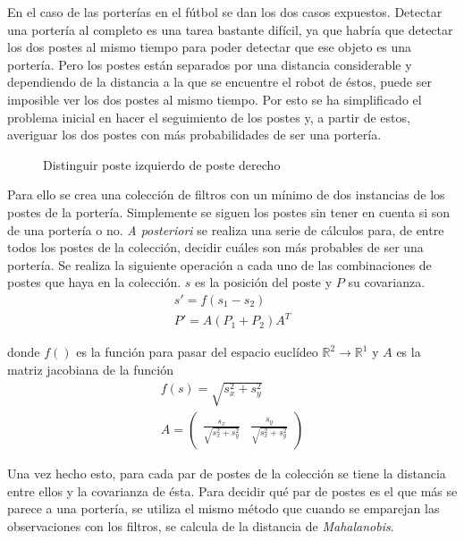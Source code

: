 En el caso de las porterías en el fútbol se dan los dos casos expuestos. Detectar una portería al completo es una tarea bastante difícil, ya que habría que detectar los dos postes al mismo tiempo para poder detectar que ese objeto es una portería. Pero los postes están separados por una distancia considerable y dependiendo de la distancia a la que se encuentre el robot de éstos, puede ser imposible ver los dos postes al mismo tiempo. Por esto se ha simplificado el problema inicial en hacer el seguimiento de los postes y, a partir de estos, averiguar los dos postes con más probabilidades de ser una portería.

\begin{figure} [h]
  \centering
  \caption{Distinguir poste izquierdo de poste derecho}
  \label{fig:prod_vectorial}
\end{figure}

Para ello se crea una colección de filtros con un mínimo de dos instancias de los postes de la portería. Simplemente se siguen los postes sin tener en cuenta si son de una portería o no. \textit{A posteriori} se realiza una serie de cálculos para, de entre todos los postes de la colección, decidir cuáles son más probables de ser una portería. Se realiza la siguiente operación a cada uno de las combinaciones de postes que haya en la colección. $s$ es la posición del poste y $P$ su covarianza.
\begin{equation}
  \begin{split}
    s' = f(s_1 - s_2) \\
    P' = A (P_1 + P_2) A^T 
  \end{split}
\end{equation}

donde $f()$ es la función para pasar del espacio euclídeo $\mathbb{R}^2 \rightarrow \mathbb{R}^1$ y $A$ es la matriz jacobiana de la función
\begin{equation}
  \begin{split}
    f(s) = \sqrt{s_x^2 + s_y^2} \\
    A = \begin{pmatrix} \frac{s_x}{\sqrt{s_x^2 + s_y^2}} & \frac{s_y}{\sqrt{s_x^2 + s_y^2}} \end{pmatrix}    
  \end{split}
\end{equation}

Una vez hecho esto, para cada par de postes de la colección se tiene la distancia entre ellos y la covarianza de ésta. Para decidir qué par de postes es el que más se parece a una portería, se utiliza el mismo método que cuando se emparejan las observaciones con los filtros, se calcula de la distancia de \textit{Mahalanobis}. 


